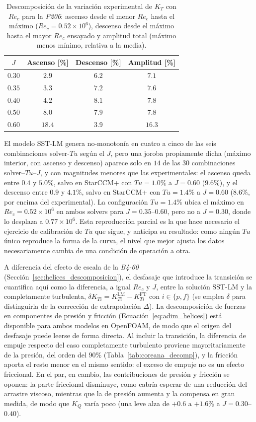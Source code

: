 \begin{table}[htpb]
\centering
\caption{Descomposición de la variación experimental de $K_T$ con $Re_c$ para la \textit{P206}:
ascenso desde el menor $Re_c$ hasta el máximo ($Re_c=0.52\times10^6$), descenso desde el
máximo hasta el mayor $Re_c$ ensayado y amplitud total (máximo menos mínimo, relativa a la
media).}
\label{tab:joroba_ramas}
\begin{tabular}{cccc}
\hline
$J$ & Ascenso [\%] & Descenso [\%] & Amplitud [\%] \\
\hline
$0.30$ & $2.9$  & $6.2$ & $7.1$  \\
$0.35$ & $3.3$  & $7.2$ & $7.6$  \\
$0.40$ & $4.2$  & $8.1$ & $7.8$  \\
$0.50$ & $8.0$  & $7.9$ & $7.8$  \\
$0.60$ & $18.4$ & $3.9$ & $16.3$ \\
\hline
\end{tabular}
\end{table}

El modelo SST-LM genera no-monotonía en cuatro a cinco de las seis combinaciones
solver-$Tu$ según el $J$, pero una joroba propiamente dicha (máximo interior, con ascenso
y descenso) aparece solo en $14$ de las $30$ combinaciones solver--$Tu$--$J$, y con
magnitudes menores que las experimentales: el ascenso queda entre $0.4$ y $5.0\%$, salvo
en StarCCM+ con $Tu=1.0\%$ a $J=0.60$ ($9.6\%$), y el descenso entre $0.9$ y $4.1\%$,
salvo en StarCCM+ con $Tu=1.4\%$ a $J=0.60$ ($8.6\%$, por encima del experimental). La
configuración $Tu=1.4\%$ ubica el máximo en $Re_c=0.52\times10^6$ en ambos solvers para
$J=0.35$--$0.60$, pero no a $J=0.30$, donde lo desplaza a $0.77\times10^6$. Esta reproducción parcial es la que hace necesario el ejercicio de calibración
de $Tu$ que sigue, y anticipa su resultado: como ningún $Tu$ único reproduce la forma de
la curva, el nivel que mejor ajusta los datos necesariamente cambia de una condición de
operación a otra.

A diferencia del efecto de escala de la \textit{B4-60} (Sección~\ref{sec:helices_descomposicion}),
el desfasaje que introduce la transición se cuantifica aquí como la diferencia, a igual
$Re_c$ y $J$, entre la solución SST-LM y la completamente turbulenta,
$\delta K_{Ti} = K_{Ti}^{\mathrm{LM}} - K_{Ti}^{\mathrm{FT}}$ con $i\in\{p,f\}$ (se emplea
$\delta$ para distinguirla de la corrección de extrapolación $\Delta$). La descomposición
de fuerzas en componentes de presión y fricción (Ecuación~\ref{eq:adim_helices}) está
disponible para ambos modelos en OpenFOAM, de modo que el origen del desfasaje puede
leerse de forma directa. Al incluir la transición, la diferencia de empuje respecto del
caso completamente turbulento proviene mayoritariamente de la presión, del orden del $90\%$ (Tabla~\ref{tab:coreana_decomp}), y la fricción aporta el resto menor en el mismo sentido: el exceso de empuje no
es un efecto friccional. En el par, en cambio, las contribuciones de presión y fricción
se oponen: la parte friccional disminuye, como cabría esperar de una reducción del
arrastre viscoso, mientras que la de presión aumenta y la compensa en gran medida, de
modo que $K_Q$ varía poco (una leve alza de $+0.6$ a $+1.6\%$ a $J = 0.30$--$0.40$). 

